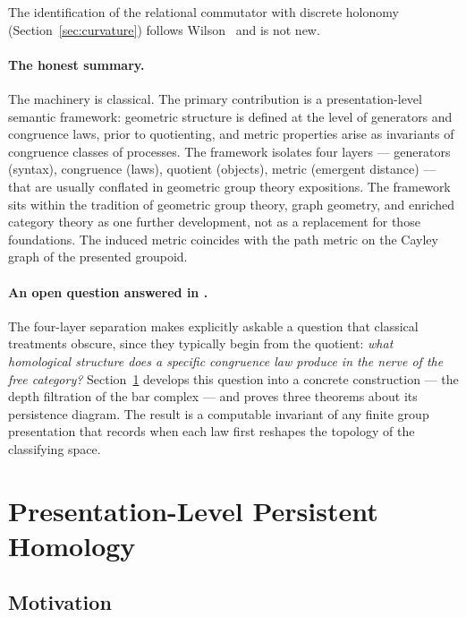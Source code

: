 \documentclass{article}
\theoremstyle{definition}
\theoremstyle{remark}
\begin{document}
The identification of the relational commutator with discrete
holonomy (Section~\ref{sec:curvature}) follows Wilson~\cite{wilson74}
and is not new.

\paragraph{The honest summary.}
The machinery is classical. The primary contribution is a
presentation-level semantic framework: geometric structure is
defined at the level of generators and congruence laws, prior to
quotienting, and metric properties arise as invariants of
congruence classes of processes. The framework isolates four
layers --- generators (syntax), congruence (laws), quotient
(objects), metric (emergent distance) --- that are usually
conflated in geometric group theory expositions. The framework
sits within the tradition of geometric group theory, graph
geometry, and enriched category theory as one further development,
not as a replacement for those foundations. The induced metric
coincides with the path metric on the Cayley graph of the
presented groupoid.

\paragraph{An open question answered in .}
The four-layer separation makes explicitly askable a question
that classical treatments obscure, since they typically begin
from the quotient: \emph{what homological structure does a
specific congruence law produce in the nerve of the free
category?} Section~\ref{sec:persistent} develops this question
into a concrete construction --- the depth filtration of the bar
complex --- and proves three theorems about its persistence
diagram. The result is a computable invariant of any finite
group presentation that records when each law first reshapes the
topology of the classifying space.

\section{Presentation-Level Persistent Homology}
\label{sec:persistent}

\subsection{Motivation}
\end{document}
